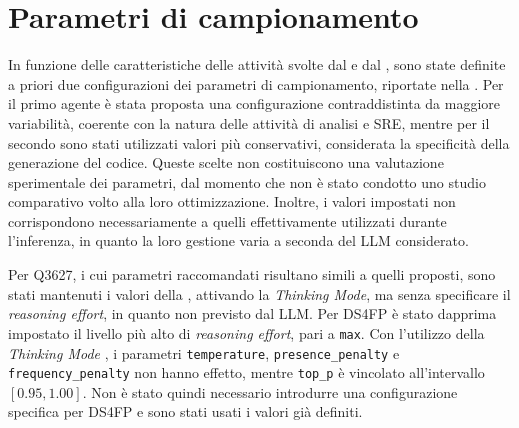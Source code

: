 \section{Parametri di campionamento}

In funzione delle caratteristiche delle attività svolte dal \sreagent{} e dal \codeagent{}, sono state definite a priori due configurazioni dei parametri di campionamento, riportate nella . Per il primo agente è stata proposta una configurazione contraddistinta da maggiore variabilità, coerente con la natura delle attività di analisi e SRE, mentre per il secondo sono stati utilizzati valori più conservativi, considerata la specificità della generazione del codice. Queste scelte non costituiscono una valutazione sperimentale dei parametri, dal momento che non è stato condotto uno studio comparativo volto alla loro ottimizzazione. Inoltre, i valori impostati non corrispondono necessariamente a quelli effettivamente utilizzati durante l'inferenza, in quanto la loro gestione varia a seconda del LLM considerato.

Per Q3627, i cui parametri raccomandati \cite{qwen2026sampling} risultano simili a quelli proposti, sono stati mantenuti i valori della , attivando la \emph{Thinking Mode}, ma senza specificare il \emph{reasoning effort}, in quanto non previsto dal LLM. Per DS4FP è stato dapprima impostato il livello più alto di \emph{reasoning effort}, pari a \texttt{max}. Con l'utilizzo della \emph{Thinking Mode} \cite{deepseek2026thinking}, i parametri \texttt{temperature}, \texttt{presence\_penalty} e \texttt{frequency\_penalty} non hanno effetto, mentre \texttt{top\_p} è vincolato all'intervallo $[0.95, 1.00]$. Non è stato quindi necessario introdurre una configurazione specifica per DS4FP e sono stati usati i valori già definiti.





